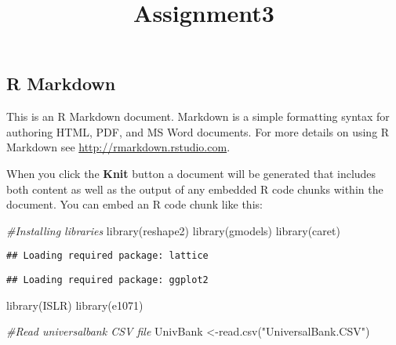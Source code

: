 \documentclass[
]{article}
\title{Assignment3}
\author{}
\date{\vspace{-2.5em}}
\newenvironment{Shaded}{\begin{snugshade}}{\end{snugshade}}
\newcommand{\CommentTok}[1]{\textcolor[rgb]{0.56,0.35,0.01}{\textit{#1}}}
\newcommand{\FunctionTok}[1]{\textcolor[rgb]{0.00,0.00,0.00}{#1}}
\newcommand{\NormalTok}[1]{#1}
\newcommand{\OtherTok}[1]{\textcolor[rgb]{0.56,0.35,0.01}{#1}}
\newcommand{\SpecialCharTok}[1]{\textcolor[rgb]{0.00,0.00,0.00}{#1}}
\newcommand{\StringTok}[1]{\textcolor[rgb]{0.31,0.60,0.02}{#1}}
\begin{document}
\maketitle

\hypertarget{r-markdown}{%
\subsection{R Markdown}\label{r-markdown}}

This is an R Markdown document. Markdown is a simple formatting syntax
for authoring HTML, PDF, and MS Word documents. For more details on
using R Markdown see \url{http://rmarkdown.rstudio.com}.

When you click the \textbf{Knit} button a document will be generated
that includes both content as well as the output of any embedded R code
chunks within the document. You can embed an R code chunk like this:

\begin{Shaded}
\begin{Highlighting}[]
\CommentTok{\#Installing libraries }
\FunctionTok{library}\NormalTok{(reshape2)}
\FunctionTok{library}\NormalTok{(gmodels)}
\FunctionTok{library}\NormalTok{(caret)}
\end{Highlighting}
\end{Shaded}

\begin{verbatim}
## Loading required package: lattice
\end{verbatim}

\begin{verbatim}
## Loading required package: ggplot2
\end{verbatim}

\begin{Shaded}
\begin{Highlighting}[]
\FunctionTok{library}\NormalTok{(ISLR)}
\FunctionTok{library}\NormalTok{(e1071)}
\end{Highlighting}
\end{Shaded}

\begin{Shaded}
\begin{Highlighting}[]
\CommentTok{\#Read universalbank CSV file}
\NormalTok{UnivBank }\OtherTok{\textless{}{-}}\FunctionTok{read.csv}\NormalTok{(}\StringTok{"UniversalBank.CSV"}\NormalTok{)}
\end{Highlighting}
\end{Shaded}

\begin{Shaded}
\end{Shaded}
\end{document}
